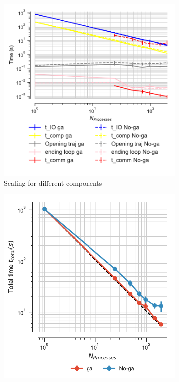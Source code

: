 \begin{figure}[ht!]
\centering
\begin{subfigure}{.32\textwidth}
  \includegraphics[width=\linewidth]{figures/Comparison_IO_compute_scaling_traj_splitting.pdf}
  \caption{Scaling for different components}
  \label{fig:ScalingComputeIO-split}
\end{subfigure}
\hfill
\begin{subfigure}{.3\textwidth}
  \includegraphics[width=\linewidth]{figures/Comparison_tot_time_traj_splitting.pdf}

\end{subfigure}
\end{figure}
